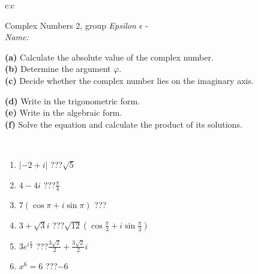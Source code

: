 \documentclass[10pt]{report}
\begin{document}
\newpage
\thispagestyle{empty}
\begin{tabular}{c:c}
\begin{minipage}[c][104.5mm][t]{0.5\linewidth}
\begin{center}
\vspace{5mm}
{\huge Complex Numbers 2, group \textit{Epsilon $\epsilon$} -}\\[5mm]
\textit{Name:}\phantom{xxxxxxxxxxxxxxxxxxxxxxxxxxxxxxxxxxxxxxxxxxxxxxxxxxxxxxxxxxxxxxxxx}\\[5mm]
\begin{minipage}{0.95\linewidth}
\begin{center}
{\small \begin{minipage}{0.44\textwidth} \raggedright
\textbf{(a)} Calculate the absolute value of the complex number. \\[1mm]
\textbf{(b)} Determine the argument \(\varphi\). \\[1mm]
\textbf{(c)} Decide whether the complex number lies on the imaginary axis. \end{minipage} \begin{minipage}{0.54\textwidth}
\textbf{(d)} Write in the trigonometric form. \\[1mm]
\textbf{(e)} Write in the algebraic form. \\[1mm]
\textbf{(f)} Solve the equation and calculate the product of its solutions.
\end{minipage}
}
\end{center}
\end{minipage}
\\[1mm]
\begin{minipage}{0.79\linewidth}
\begin{center}
\begin{varwidth}{\linewidth}
\setlength{\itemsep}{0pt}
\begin{enumerate}
\large
\item $|-2+i|$\quad \dotfill\; ???\;\dotfill \quad $\sqrt{5}$
\item $4-4i$\quad \dotfill\; ???\;\dotfill \quad $\frac{\pi}{4}$
\item $7\left(\cos{\pi}+i\sin{\pi}\right)$\quad \dotfill\; ???\;\dotfill \quad {}
\item $3+\sqrt{3}i$\quad \dotfill\; ???\;\dotfill \quad $\sqrt{12}\left(\cos{\frac{\pi}{3}}+i\sin{\frac{\pi}{3}}\right)$
\item $3e^{i\frac{\pi}{4}}$\quad \dotfill\; ???\;\dotfill \quad $\frac{3\sqrt{2}}{2}+\frac{3\sqrt{2}}{2}i$
\item $x^6=6$\quad \dotfill\; ???\;\dotfill \quad $-6$

\end{enumerate}
\end{varwidth}
\end{center}
\end{minipage}
\end{center}
\end{minipage}
\end{tabular}
\end{document}
